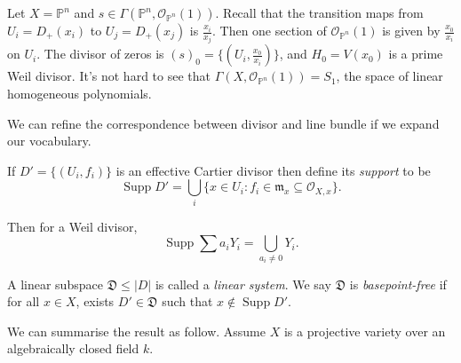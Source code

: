 \documentclass[a4paper]{article}
\renewcommand*{\P}{\mathbb{P}}
\newcommand{\sh}[1]{\mathcal{#1}} %
\DeclareMathOperator{\Supp}{Supp} %
\begin{document}
\begin{eg}
  Let \(X = \P^n\) and \(s \in \Gamma(\P^n, \sh O_{\P^n}(1))\). Recall that the transition maps from \(U_i = D_+(x_i)\) to \(U_j = D_+(x_j)\) is \(\frac{x_i}{x_j}\). Then one section of \(\sh O_{\P^n}(1)\) is given by \(\frac{x_0}{x_i}\) on \(U_i\). The divisor of zeros is \((s)_0 = \{(U_i, \frac{x_0}{x_i})\}\), and \(H_0 = V(x_0)\) is a prime Weil divisor. It's not hard to see that \(\Gamma(X, \sh O_{\P^n}(1)) = S_1\), the space of linear homogeneous polynomials.
\end{eg}

We can refine the correspondence between divisor and line bundle if we expand our vocabulary.

\begin{definition}
  If \(D' = \{(U_i, f_i)\}\) is an effective Cartier divisor then define its \emph{support} to be
  \[
    \Supp D' = \bigcup_i \{x \in U_i: f_i \in \mathfrak m_x \subseteq \sh O_{X, x}\}.
  \]
\end{definition}
Then for a Weil divisor,
\[
  \Supp \sum a_iY_i = \bigcup_{a_i \neq 0} Y_i.
\]

\begin{definition}
  A linear subspace \(\mathfrak D \leq |D|\) is called a \emph{linear system}. We say \(\mathfrak D\) is \emph{basepoint-free} if for all \(x \in X\), exists \(D' \in \mathfrak D\) such that \(x \notin \Supp D'\).
\end{definition}

We can summarise the result as follow. Assume \(X\) is a projective variety over an algebraically closed field \(k\).
\end{document}
